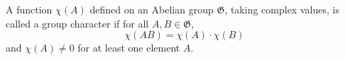 A function $\chi(A)$ defined on an Abelian group $\mathfrak{G}$, taking complex values, is called a group character if for all $A, B \in \mathfrak{G}$,
$$\chi(AB) = \chi(A) \cdot \chi(B)$$
and $\chi(A) \neq 0$ for at least one element $A$.
